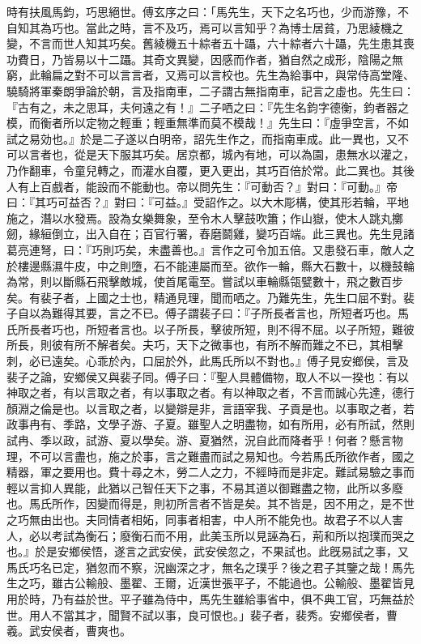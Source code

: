 \begin{pinyinscope}
時有扶風馬鈞，巧思絕世。傅玄序之曰：「馬先生，天下之名巧也，少而游豫，不自知其為巧也。當此之時，言不及巧，焉可以言知乎？為博士居貧，乃思綾機之變，不言而世人知其巧矣。舊綾機五十綜者五十躡，六十綜者六十躡，先生患其喪功費日，乃皆易以十二躡。其奇文異變，因感而作者，猶自然之成形，陰陽之無窮，此輪扁之對不可以言言者，又焉可以言校也。先生為給事中，與常侍高堂隆、驍騎將軍秦朗爭論於朝，言及指南車，二子謂古無指南車，記言之虛也。先生曰：『古有之，未之思耳，夫何遠之有！』二子哂之曰：『先生名鈞字德衡，鈞者器之模，而衡者所以定物之輕重；輕重無準而莫不模哉！』先生曰：『虛爭空言，不如試之易効也。』於是二子遂以白明帝，詔先生作之，而指南車成。此一異也，又不可以言者也，從是天下服其巧矣。居京都，城內有地，可以為園，患無水以灌之，乃作翻車，令童兒轉之，而灌水自覆，更入更出，其巧百倍於常。此二異也。其後人有上百戲者，能設而不能動也。帝以問先生：『可動否？』對曰：『可動。』帝曰：『其巧可益否？』對曰：『可益。』受詔作之。以大木彫構，使其形若輪，平地施之，潛以水發焉。設為女樂舞象，至令木人擊鼓吹簫；作山嶽，使木人跳丸擲劒，緣絙倒立，出入自在；百官行署，舂磨鬬雞，變巧百端。此三異也。先生見諸葛亮連弩，曰：『巧則巧矣，未盡善也。』言作之可令加五倍。又患發石車，敵人之於樓邊縣濕牛皮，中之則墮，石不能連屬而至。欲作一輪，縣大石數十，以機鼓輪為常，則以斷縣石飛擊敵城，使首尾電至。嘗試以車輪縣瓴甓數十，飛之數百步矣。有裴子者，上國之士也，精通見理，聞而哂之。乃難先生，先生口屈不對。裴子自以為難得其要，言之不已。傅子謂裴子曰：『子所長者言也，所短者巧也。馬氏所長者巧也，所短者言也。以子所長，擊彼所短，則不得不屈。以子所短，難彼所長，則彼有所不解者矣。夫巧，天下之微事也，有所不解而難之不已，其相擊刺，必已遠矣。心乖於內，口屈於外，此馬氏所以不對也。』傅子見安鄉侯，言及裴子之論，安鄉侯又與裴子同。傅子曰：『聖人具體備物，取人不以一揆也：有以神取之者，有以言取之者，有以事取之者。有以神取之者，不言而誠心先達，德行顏淵之倫是也。以言取之者，以變辯是非，言語宰我、子貢是也。以事取之者，若政事冉有、季路，文學子游、子夏。雖聖人之明盡物，如有所用，必有所試，然則試冉、季以政，試游、夏以學矣。游、夏猶然，況自此而降者乎！何者？懸言物理，不可以言盡也，施之於事，言之難盡而試之易知也。今若馬氏所欲作者，國之精器，軍之要用也。費十尋之木，勞二人之力，不經時而是非定。難試易驗之事而輕以言抑人異能，此猶以己智任天下之事，不易其道以御難盡之物，此所以多廢也。馬氏所作，因變而得是，則初所言者不皆是矣。其不皆是，因不用之，是不世之巧無由出也。夫同情者相妬，同事者相害，中人所不能免也。故君子不以人害人，必以考試為衡石；廢衡石而不用，此美玉所以見誣為石，荊和所以抱璞而哭之也。』於是安鄉侯悟，遂言之武安侯，武安侯忽之，不果試也。此旣易試之事，又馬氏巧名已定，猶忽而不察，況幽深之才，無名之璞乎？後之君子其鑒之哉！馬先生之巧，雖古公輸般、墨翟、王爾，近漢世張平子，不能過也。公輸般、墨翟皆見用於時，乃有益於世。平子雖為侍中，馬先生雖給事省中，俱不典工官，巧無益於世。用人不當其才，聞賢不試以事，良可恨也。」裴子者，裴秀。安鄉侯者，曹羲。武安侯者，曹爽也。


\end{pinyinscope}